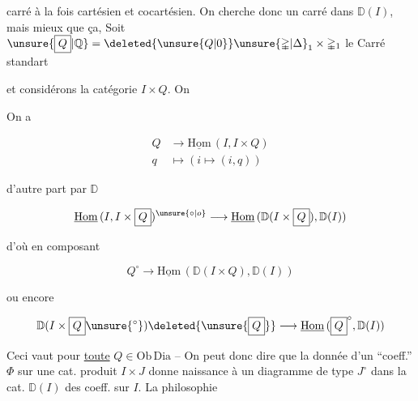 

carré à la fois cartésien et cocartésien. On cherche donc un carré dans $\mathbb D(I)$, mais mieux que ça, Soit $\unsure{\boxed{Q}|\mathbb Q}=\deleted{\unsure{Q|0}}\unsure{\mathbb{\Delta}|\Delta}_{1}\times\mathbb{\Delta}_{1}$ le Carré standart


et considérons la catégorie $I\times\boxed{Q}$. On

On a

\[
\begin{aligned}
\boxed{Q}&\longrightarrow\underline{\mathrm{Hom}}\,(I,I\times\boxed{Q})\\
q&\longmapsto(i\longmapsto(i,q))
\end{aligned}
\]

d'autre part par $\mathbb D$

\[
\underline{\mathrm{Hom}}\,(I,I\times\boxed{Q})^{\unsure{\circ|o}}\longrightarrow\underline{\mathrm{Hom}}\,(\mathbb D(I\times\boxed{Q}),\mathbb D(I))
\]

d'où en composant

\[
\boxed{Q}^{\circ}\longrightarrow\underline{\mathrm{Hom}}\,(\mathbb D(I\times\boxed{Q}),\mathbb D(I))
\]

ou encore

\[
\mathbb D(I\times\boxed{Q}\unsure{{}^{\circ}})\deleted{\unsure{\boxed{Q}}}\longrightarrow\underline{\mathrm{Hom}}\,(\boxed{Q}^{\circ},\mathbb D(I))
\]

Ceci vaut pour \uline{toute} $Q\in\mathrm{Ob}\,\mathrm{Dia}$ -- On peut donc dire que  la donnée d'un ``coeff.'' $\Phi$ sur une cat. produit $I\times J$  donne naissance à un diagramme de type $J^{\circ}$ dans la cat. $\mathbb D(I)$ des coeff. sur $I$. La philosophie


